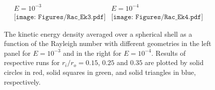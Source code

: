 \begin{figure}
\begin{center}
\[
\begin{array}{cc}
\mbox{$E = 10^{-3}$} & \mbox{$E = 10^{-4}$} \\
\texttt{[image: Figures/Rac\_Ek3.pdf]} &
\texttt{[image: Figures/Rac\_Ek4.pdf]}
\end{array}
\]
\end{center}
\caption{{\color{red}
The kinetic energy density averaged over a spherical shell as a function of the Rayleigh number with different geometries in the left panel for $E = 10^{-3}$ and in the right for $E = 10^{-4}$. 
Results of respective runs for $r_i/r_o = 0.15$, $0.25$ and $0.35$ are plotted by solid circles in red, solid squares in green, and solid triangles in blue, respectively. 
}
}
\label{fig:fig_1}
\end{figure}